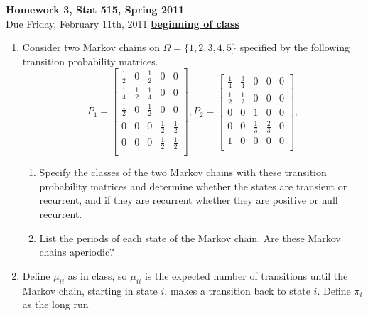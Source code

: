 \documentclass[12pt]{article}
\begin{document}
\begin{center}
\Large
{\bf Homework 3, Stat 515, Spring 2011}\\
\normalsize
Due Friday, February 11th, 2011 \underline{{\bf beginning of class}}\\
\end{center}
\begin{enumerate}
\item Consider two Markov chains on $\Omega=\{1, 2, 3, 4, 5\}$ specified by the following transition probability matrices.
\begin{equation*}
  P_1=
  \begin{bmatrix}
    \frac{1}{2} & 0   & \frac{1}{2}  & 0 & 0 \\
    \frac{1}{4} & \frac{1}{2}   & \frac{1}{4}  & 0 & 0\\
    \frac{1}{2} & 0  & \frac{1}{2}  & 0 & 0\\
    0 & 0   & 0  & \frac{1}{2} & \frac{1}{2}\\
    0 & 0   & 0  & \frac{1}{2} & \frac{1}{2}\\
  \end{bmatrix},
  P_2=
  \begin{bmatrix}
    \frac{1}{4} & \frac{3}{4}   & 0  & 0 & 0 \\
    \frac{1}{2} & \frac{1}{2}   & 0  & 0 & 0\\
    0 & 0  & 1  & 0 & 0\\
    0 & 0   & \frac{1}{3}  & \frac{2}{3} & 0\\
    1 & 0   & 0  & 0 & 0\\
  \end{bmatrix},
\end{equation*}
\begin{enumerate}
\item Specify the classes of the two Markov chains with these transition probability matrices and determine whether the states are transient or recurrent, and if they are recurrent whether they are positive or null recurrent.
\item List the periods of each state of the Markov chain. Are these Markov chains aperiodic? 
\end{enumerate}
\item Define $\mu_{ii}$ as in class, so $\mu_{ii}$ is the expected
  number of transitions until the Markov chain, starting in state $i$,
  makes a transition back to state $i$. Define $\pi_i$ as the long run

\end{enumerate}
\end{document}

